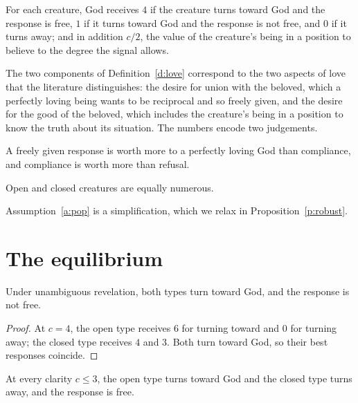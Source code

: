 \documentclass{situationist-preprint}
\begin{document}
\begin{definition}\label{d:love}
For each creature, God receives $4$ if the creature turns toward God and the response is free, $1$ if it turns toward God and the response is not free, and $0$ if it turns away; and in addition $c/2$, the value of the creature's being in a position to believe to the degree the signal allows.
\end{definition}

The two components of Definition~\ref{d:love} correspond to the two aspects of love that the literature distinguishes: the desire for union with the beloved, which a perfectly loving being wants to be reciprocal and so freely given, and the desire for the good of the beloved, which includes the creature's being in a position to know the truth about its situation. The numbers encode two judgements.

\begin{assumption}\label{a:priority}
A freely given response is worth more to a perfectly loving God than compliance, and compliance is worth more than refusal.
\end{assumption}

\begin{assumption}[Population]\label{a:pop}
Open and closed creatures are equally numerous.
\end{assumption}

Assumption~\ref{a:pop} is a simplification, which we relax in Proposition~\ref{p:robust}.

\section{The equilibrium}

\begin{lemma}\label{l:pool}
Under unambiguous revelation, both types turn toward God, and the response is not free.
\end{lemma}

\begin{proof}
At $c = 4$, the open type receives $6$ for turning toward and $0$ for turning away; the closed type receives $4$ and $3$. Both turn toward God, so their best responses coincide.
\end{proof}

\begin{lemma}\label{l:sep}
At every clarity $c \leq 3$, the open type turns toward God and the closed type turns away, and the response is free.
\end{lemma}
\end{document}
